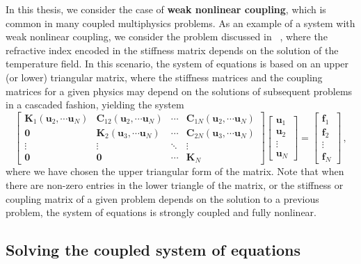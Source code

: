 In this thesis, we consider the case of \textbf{weak nonlinear coupling},
 which is common in many
 coupled multiphysics problems. As an example of a system with weak nonlinear coupling, we consider the problem discussed in ~\cite{ownpub0}, where the refractive index encoded in 
 the stiffness matrix depends on the solution of the temperature field.
 In this scenario, the system of equations is based on an upper (or lower) triangular matrix, where the stiffness matrices and the coupling matrices for a given physics may depend 
 on the solutions of subsequent problems in a cascaded fashion, yielding the system
     \begin{equation} \label{eq:multiphysics_weak_nonlinear}
        \begin{bmatrix}
 \mathbf{K}_1(\mathbf{u}_2, \cdots \mathbf{u}_N)    & \mathbf{C}_{12} (\mathbf{u}_2, \cdots \mathbf{u}_N)& \cdots & \mathbf{C}_{1N}(\mathbf{u}_2, \cdots \mathbf{u}_N) \\
            \mathbf{0} & \mathbf{K}_2 (\mathbf{u}_3, \cdots \mathbf{u}_N)   & \cdots & \mathbf{C}_{2N} (\mathbf{u}_3, \cdots \mathbf{u}_N)\\
            \vdots          & \vdots          & \ddots & \vdots          \\
            \mathbf{0} & \mathbf{0} & \cdots & \mathbf{K}_N
        \end{bmatrix}
        \begin{bmatrix}
 \mathbf{u}_1 \\
 \mathbf{u}_2 \\
            \vdots       \\
 \mathbf{u}_N
        \end{bmatrix}
 =
        \begin{bmatrix}
 \mathbf{f}_1\\
 \mathbf{f}_2\\
            \vdots       \\
 \mathbf{f}_N
        \end{bmatrix}\,,
    \end{equation}
 where we have chosen the upper triangular form of the matrix.
 Note that when there are non-zero entries in the lower triangle of the matrix, or the stiffness or coupling matrix of a given problem depends on the solution to a previous problem, the system of equations is strongly coupled and fully nonlinear.

 \subsection*{Solving the coupled system of equations}


